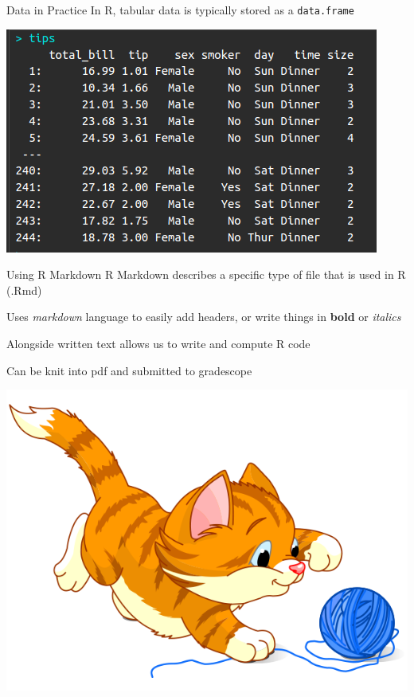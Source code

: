 \documentclass{beamer}
\begin{document}
\begin{frame}{Data in Practice}
In R, tabular data is typically stored as a \texttt{data.frame}
\begin{center}
\includegraphics[scale=0.5]{r_tips.png}
\end{center}
\end{frame}

\begin{frame}{Using R Markdown}
R Markdown describes a specific type of file that is used in R (.Rmd) \vspace{3mm}

Uses \textit{markdown} language to easily add headers, or write things in \textbf{bold} or \textit{italics} \vspace{3mm}

Alongside written text allows us to write and compute R code \vspace{3mm}

Can be knit into pdf and submitted to gradescope

\begin{center}
\includegraphics[scale=0.15]{cat_yarn2.png}
\end{center}

\end{frame}
\end{document}
